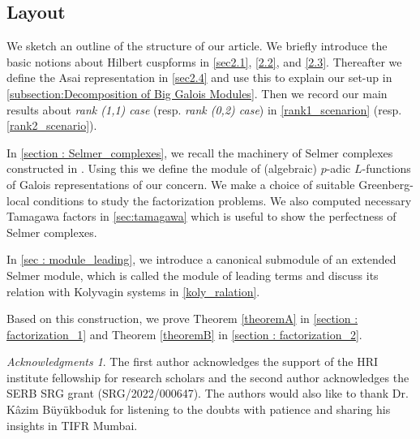 \documentclass[10pt]{amsart}
\numberwithin{equation}{section}
\theoremstyle{definition}
\theoremstyle{remark} %
\newtheorem*{acknowledgements}{Acknowledgments}
\begin{document}
	\subsection{Layout}
	We sketch an outline of the structure of our article. We briefly introduce the basic notions about Hilbert cuspforms in \textsection \ref{sec2.1}, \textsection \ref{2.2}, and \textsection \ref{2.3}. Thereafter we define the Asai representation in \textsection \ref{sec2.4} and use this to explain our set-up in \textsection \ref{subsection:Decomposition of Big Galois Modules}. Then we record our main results about \emph{rank (1,1) case} (resp. \emph{rank (0,2) case}) in \textsection \ref{rank1_scenarion} (resp. \textsection \ref{rank2_scenario}). 
	
	In \cref{section : Selmer_complexes}, we recall the machinery of Selmer complexes constructed in \cite{Nek06}. Using this we define the module of (algebraic) $p$-adic $L$-functions of Galois representations of our concern. We make a choice of suitable Greenberg-local conditions to study the factorization problems. We also computed necessary Tamagawa factors in \textsection \ref{sec:tamagawa} which is useful to show the perfectness of Selmer complexes.
	
	In \cref{sec : module_leading}, we introduce a canonical submodule of an extended Selmer module, which is called the module of leading terms and discuss its relation with Kolyvagin systems in \cref{koly_ralation}.  
	
	Based on this construction, we prove Theorem \ref{theoremA} in \cref{section : factorization_1} and Theorem \ref{theoremB} in \cref{section : factorization_2}.
	
	\begin{acknowledgements}
		The first author acknowledges the support of the HRI institute fellowship for research scholars and the second author acknowledges the SERB SRG grant (SRG/2022/000647). The authors would also like to thank Dr. K\^{a}zim B\"{u}y\"{u}kboduk for listening to the doubts with patience and sharing his insights in TIFR Mumbai. 
	\end{acknowledgements}
\end{document}
